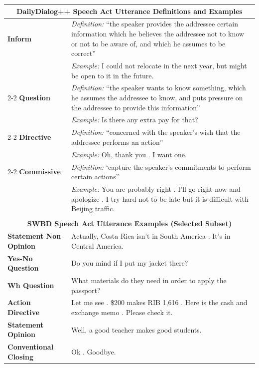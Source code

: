 \documentclass[11pt]{article}
\begin{document}
\begin{table}[ht!]
\small
    \centering
    \begin{tabular}{|p{4cm}|p{10.5cm}|}
     \multicolumn{2}{c}{\textbf{DailyDialog++ Speech Act Utterance Definitions and Examples}} \\\hline
     \rule{0pt}{1em}
     \textbf{Inform} & \textit{Definition:} ``the
speaker provides the addressee certain information which
he believes the addressee not to know or not to be aware
of, and which he assumes to be correct'' \\
& \textit{Example:} I could not relocate in the next year, but might be open to it in the future.\\\cline{2-2}
     \textbf{Question} & \textit{Definition:} ``the speaker wants to know something, which
he assumes the addressee to know, and puts pressure on the
addressee to provide this information'' \\
& \textit{Example:} Is there any extra pay for that?\\\cline{2-2}
     \textbf{Directive} & \textit{Definition:} ``concerned with the speaker’s wish
that the addressee performs an action''\\
     & \textit{Example:} Oh, thank you . I want one.\\\cline{2-2}
     \textbf{Commissive} & \textit{Definition:} `capture the speaker’s commitments to
perform certain actions'' \\
& \textit{Example:} You are probably right . I'll go right now and apologize . I try hard not to be late but it is difficult with Beijing traffic.\\\hline
     \multicolumn{2}{c}{}\\
     \multicolumn{2}{c}{\textbf{SWBD Speech Act Utterance Examples (Selected Subset)}}\\\hline
      \rule{0pt}{1em}\textbf{Statement Non Opinion}   & Actually, Costa Rica isn't in South America . It's in Central America.\\
     \textbf{Yes-No Question}   & Do you mind if I put my jacket there?\\
     \textbf{Wh Question}    & What materials do they need in order to apply the passport?\\
     \textbf{Action Directive}   & Let me see . \$200 makes RIB 1,616 . Here is the cash and exchange memo . Please check it.\\
     \textbf{Statement Opinion}    & Well, a good teacher makes good students.\\
     \textbf{Conventional Closing}    & Ok . Goodbye.\\

\end{tabular}
\end{table}
\end{document}
